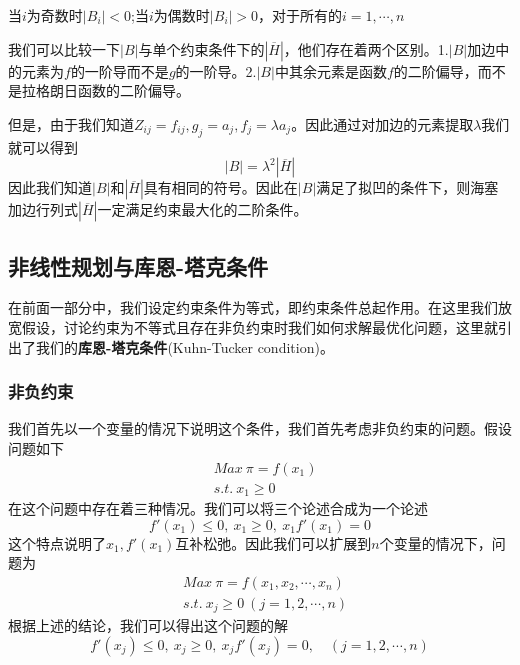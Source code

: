 \documentclass[UTF8,12pt]{ctexart}
\numberwithin{equation}{section} %
\numberwithin{figure}{section}
\numberwithin{table}{section}
\begin{document}
	当$i$为奇数时$|B_i|<0$;当$i$为偶数时$|B_i|>0$，对于所有的$i = 1,\cdots,n$
	
	我们可以比较一下$|B|$与单个约束条件下的$|\overline{H}|$，他们存在着两个区别。1.$|B|$加边中的元素为$f$的一阶导而不是$g$的一阶导。2.$|B|$中其余元素是函数$f$的二阶偏导，而不是拉格朗日函数的二阶偏导。
	
	但是，由于我们知道$Z_{ij} = f_{ij},g_j = a_j,f_j = \lambda a_j$。因此通过对加边的元素提取$\lambda$我们就可以得到
	\begin{equation}
		|B| = \lambda^2 |\overline{H}|
	\end{equation}
	因此我们知道$|B|$和$|\overline{H}|$具有相同的符号。因此在$|B|$满足了拟凹的条件下，则海塞加边行列式$|\overline{H}|$一定满足约束最大化的二阶条件。
	
	\subsection{非线性规划与库恩-塔克条件}
	在前面一部分中，我们设定约束条件为等式，即约束条件总起作用。在这里我们放宽假设，讨论约束为不等式且存在非负约束时我们如何求解最优化问题，这里就引出了我们的\textbf{库恩-塔克条件}(Kuhn-Tucker condition)。
	
	\subsubsection{非负约束}
	我们首先以一个变量的情况下说明这个条件，我们首先考虑非负约束的问题。假设问题如下
	\begin{equation}
		\begin{aligned}
			&Max \ \pi = f(x_1) \\
			&s.t. \ x_1 \geqslant 0
		\end{aligned}
	\end{equation}
	在这个问题中存在着三种情况。我们可以将三个论述合成为一个论述
	\begin{equation}
		f'(x_1) \leqslant 0, \ x_1 \geqslant 0, \ x_1f'(x_1) = 0
	\end{equation}
	这个特点说明了$x_1,f'(x_1)$互补松弛。因此我们可以扩展到$n$个变量的情况下，问题为
	\begin{equation}
		\begin{aligned}
			&Max \ \pi = f(x_1,x_2,\cdots,x_n) \\
			&s.t. \ x_j \geqslant 0 \ (j = 1,2,\cdots,n)
		\end{aligned}
	\end{equation}
	根据上述的结论，我们可以得出这个问题的解
	\begin{equation}
		f'(x_j) \leqslant 0, \ x_j \geqslant 0, \ x_jf'(x_j) = 0, \quad (j = 1,2,\cdots,n)
	\end{equation}
	
\end{document}
